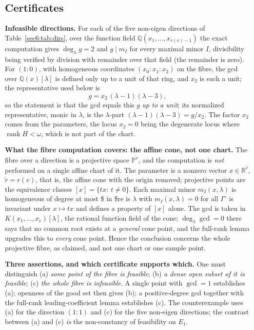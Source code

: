 \documentclass[journal]{IEEEtran}
\theoremstyle{plainn}
\theoremstyle{remark}
\newcommand{\rank}{\operatorname{rank}}
\begin{document}
\subsection{Certificates}\label{sec6:sub:cert}


\textbf{Infeasible directions.} For each of the five non-eigen directions of Table~\ref{sec6:tab:dirs},
over the function field $\mathbb{Q}(x_1,\dots,x_{r(v)-1})$ the exact computation gives
$\deg_\lambda g=2$ and $g\mid m_I$ for every maximal minor $I$, divisibility being verified by division
with remainder over that field (the remainder is zero). For $(1\!:\!0)$, with homogeneous coordinates
$(x_0\!:\!x_1\!:\!x_2)$ on the fibre, the gcd over $\mathbb{Q}(x)[\lambda]$ is defined only up to a unit
of that ring, and $x_2$ is such a unit; the representative used below is
\begin{equation}\label{sec6:eq:gexplicit}
g=x_2\,(\lambda-1)(\lambda-3),
\end{equation}
so the statement is that the gcd equals this $g$ \emph{up to a unit}; its normalized representative, monic
in $\lambda$, is the $\lambda$-part $(\lambda-1)(\lambda-3)=g/x_2$. The factor $x_2$ comes from the
parameters, the locus $x_2=0$ being the degenerate locus where $\rank H<\omega$, which is not part of the
chart.

\textbf{What the fibre computation covers: the affine cone, not one chart.} The fibre over a direction
is a projective space $\mathbb P^{\tilde r}$, and the computation is \emph{not} performed on a single
affine chart of it. The parameter is a nonzero vector $x\in\mathbb R^{\tilde r}$, $\tilde r=r(v)$, that is,
the affine cone with the origin removed; projective points are the equivalence classes
$[x]=\{tx:\ t\ne0\}$. Each maximal minor $m_I(x,\lambda)$ is homogeneous of degree at most \$ in \$re is $\lambda$ with $m_I(x,\lambda)=0$ for all $I$'' is invariant under
$x\mapsto tx$ and defines a property of $[x]$ alone. The gcd is taken in $K(x_1,\dots,x_{\tilde r})[\lambda]$,
the rational function field of the cone; $\deg_\lambda\gcd=0$ there says that no common root exists at
a \emph{general} cone point, and the full-rank lemma upgrades this to \emph{every} cone point. Hence the
conclusion concerns the whole projective fibre, as claimed, and not one chart or one sample point.

\textbf{Three assertions, and which certificate supports which.} One must distinguish
(a) \emph{some point of the fibre is feasible}; (b) \emph{a dense open subset of it is feasible};
(c) \emph{the whole fibre is infeasible}. A single point with $\gcd=1$ establishes (a); openness of the
good set then gives (b); a positive-degree gcd together with the full-rank leading-coefficient lemma
establishes (c). The counterexample uses (a) for the direction $(1\!:\!1)$ and (c) for the five
non-eigen directions; the contrast between (a) and (c) \emph{is} the non-constancy of feasibility on
$E_1$.
\end{document}
